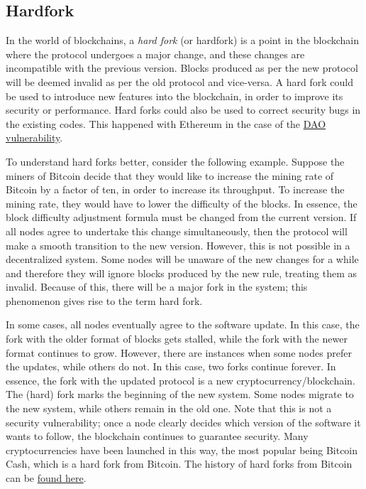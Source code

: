 \documentclass{article}
\begin{document}
\subsection*{Hardfork}
In the world of blockchains, a \textit{hard fork} (or hardfork) is a point in the blockchain where the protocol undergoes a major change, and these changes are incompatible with the previous version. Blocks produced as per the new protocol will be deemed invalid as per the old protocol and vice-versa. A hard fork could be used to introduce new features into the blockchain, in order to improve its security or performance. Hard forks could also be used to correct security bugs in the existing codes. This happened with Ethereum in the case of the \href{https://en.wikipedia.org/wiki/The_DAO_(organization)}{DAO vulnerability}.

To understand hard forks better, consider the following example. Suppose the miners of Bitcoin decide that they would like to increase the mining rate of Bitcoin by a factor of ten, in order to increase its throughput. To increase the mining rate, they would have to lower the difficulty of the blocks. In essence, the block difficulty adjustment formula must be changed from the current version. If all nodes agree to undertake this change simultaneously, then the protocol will make a smooth transition to the new version. However, this is not possible in a decentralized system. Some nodes will be unaware of the new changes for a while and therefore they will ignore blocks produced by the new rule, treating them as invalid. Because of this, there will be a major fork in the system; this phenomenon gives rise to the term hard fork.

In some cases, all nodes eventually agree to the software update. In this case, the fork with the older format of blocks gets stalled, while the fork with the newer format continues to grow. However, there are instances when some nodes prefer the updates, while others do not. In this case, two forks continue forever. In essence, the fork with the updated protocol is a new cryptocurrency/blockchain. The (hard) fork marks the beginning of the new system. Some nodes migrate to the new system, while others remain in the old one. Note that this is not a security vulnerability; once a node clearly decides which version of the software it wants to follow, the blockchain continues to guarantee security. Many cryptocurrencies have been launched in this way, the most popular being Bitcoin Cash, which is a hard fork from Bitcoin. The history of hard forks from Bitcoin can be \href{https://www.investopedia.com/tech/history-bitcoin-hard-forks/}{found here}.
\end{document}
